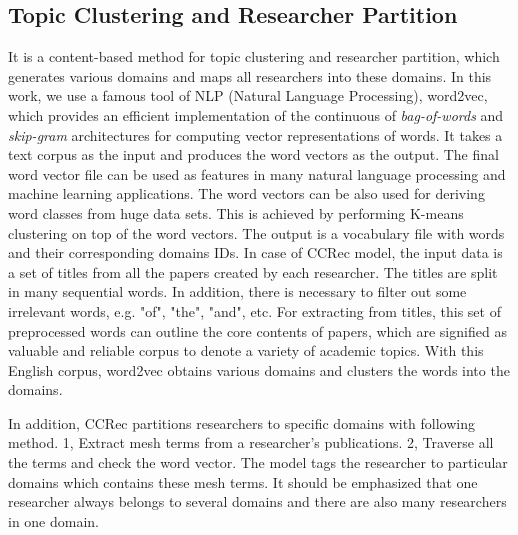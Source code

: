 \documentclass{acm_proc_article-sp}
\begin{document}
\subsection{Topic Clustering and Researcher Partition}
It is a content-based method for topic clustering and researcher partition, which generates various domains and maps all researchers into these domains. In this work, we use a famous tool of NLP (Natural Language Processing), word2vec, which provides an efficient implementation of the continuous of \emph{bag-of-words} and \emph{skip-gram} architectures for computing vector representations of words. It takes a text corpus as the input and produces the word vectors as the output. The final word vector file can be used as features in many natural language processing and machine learning applications. The word vectors can be also used for deriving word classes from huge data sets. This is achieved by performing K-means clustering on top of the word vectors. The output is a vocabulary file with words and their corresponding domains IDs. In case of CCRec model, the input data is a set of titles from all the papers created by each researcher. The titles are split in many sequential words. In addition, there is necessary to filter out some irrelevant words, e.g. "of", "the", "and", etc. For extracting from titles, this set of preprocessed words can outline the core contents of papers, which are signified as valuable and reliable corpus to denote a variety of academic topics. With this English corpus, word2vec obtains various domains and clusters the words into the domains.

In addition, CCRec partitions researchers to specific domains with following method. 1, Extract mesh terms from a researcher's publications. 2, Traverse all the terms and check the word vector. The model tags the researcher to particular domains which contains these mesh terms. It should be emphasized that one researcher always belongs to several domains and there are also many researchers in one domain.
\end{document}
